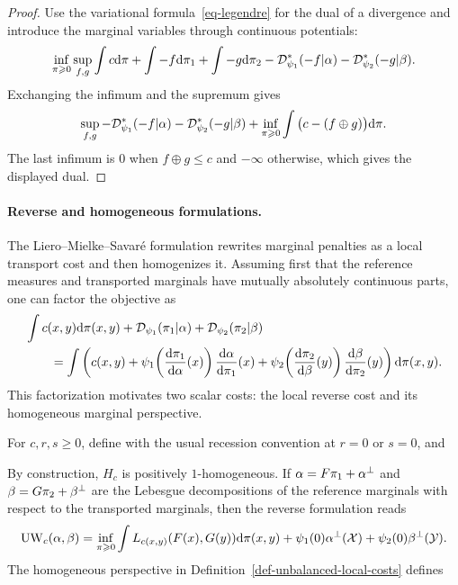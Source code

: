 \begin{proof}
	Use the variational formula~\eqref{eq-legendre} for the dual of a divergence and introduce the marginal variables through continuous potentials:
	\[
	\inf_{\pi\geqslant0}\sup_{f,g}
	\int c\mathrm{d}\pi + \int -f\mathrm{d}\pi_1 + \int -g\mathrm{d}\pi_2
	-
	\mathcal{D}_{\psi_1}^*(-f|\alpha)
	-
	\mathcal{D}_{\psi_2}^*(-g|\beta).
	\]
	Exchanging the infimum and the supremum gives
	\[
	\sup_{f,g}
	-
	\mathcal{D}_{\psi_1}^*(-f|\alpha)
	-
	\mathcal{D}_{\psi_2}^*(-g|\beta)
	+
	\inf_{\pi\geqslant0}\int\big(c-(f\oplus g)\big)\mathrm{d}\pi.
	\]
	The last infimum is $0$ when $f\oplus g\leq c$ and $-\infty$ otherwise, which gives the displayed dual.
\end{proof}

\paragraph{Reverse and homogeneous formulations.}

The Liero--Mielke--Savar\'e formulation rewrites marginal penalties as a local transport cost and then homogenizes it. Assuming first that the reference measures and transported marginals have mutually absolutely continuous parts, one can factor the objective as
\begin{align*}
&\int c(x,y)\mathrm{d}\pi(x,y)
+\mathcal{D}_{\psi_1}(\pi_1|\alpha)+\mathcal{D}_{\psi_2}(\pi_2|\beta) \\
&\qquad =
\int
\left(
	c(x,y)
	+
	\psi_1\!\left(\frac{\mathrm{d}\pi_1}{\mathrm{d}\alpha}(x)\right)\frac{\mathrm{d}\alpha}{\mathrm{d}\pi_1}(x)
	+
	\psi_2\!\left(\frac{\mathrm{d}\pi_2}{\mathrm{d}\beta}(y)\right)\frac{\mathrm{d}\beta}{\mathrm{d}\pi_2}(y)
\right)
\mathrm{d}\pi(x,y).
\end{align*}
This factorization motivates two scalar costs: the local reverse cost and its homogeneous marginal perspective.
\begin{defn}\label{def-unbalanced-local-costs}
For $c,r,s\geq0$, define
with the usual recession convention at $r=0$ or $s=0$, and
\end{defn}
By construction, $H_c$ is positively $1$-homogeneous.
If $\alpha=F\pi_1+\alpha^\perp$ and $\beta=G\pi_2+\beta^\perp$ are the Lebesgue decompositions of the reference marginals with respect to the transported marginals, then the reverse formulation reads
\[
	\operatorname{UW}_c(\alpha,\beta)
	=
	\inf_{\pi\geqslant0}
	\int L_{c(x,y)}(F(x),G(y))\mathrm{d}\pi(x,y)
	+
	\psi_1(0)\alpha^\perp(\mathcal{X})
	+
	\psi_2(0)\beta^\perp(\mathcal{Y}).
\]
The homogeneous perspective in Definition~\ref{def-unbalanced-local-costs} defines

